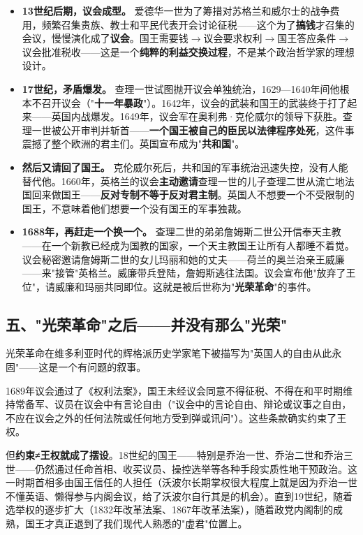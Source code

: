 \documentclass[a4paper,12pt]{ctexart}
\begin{document}
\begin{itemize}
  \item \textbf{13世纪后期，议会成型。} 爱德华一世为了筹措对苏格兰和威尔士的战争费用，频繁召集贵族、教士和平民代表开会讨论征税——这个为了\textbf{搞钱}才召集的会议，慢慢演化成了\textbf{议会}。国王需要钱$\to$议会要求权利$\to$国王答应条件$\to$议会批准税收——这是一个\textbf{纯粹的利益交换过程}，不是某个政治哲学家的理想设计。

  \item \textbf{17世纪，矛盾爆发。} 查理一世试图抛开议会单独统治，1629—1640年间他根本不召开议会（"\textbf{十一年暴政}"）。1642年，议会的武装和国王的武装终于打了起来——英国内战爆发。1649年，议会军在奥利弗·克伦威尔的领导下获胜。查理一世被公开审判并斩首——\textbf{一个国王被自己的臣民以法律程序处死}，这件事震撼了整个欧洲的君主们。英国宣布成为"\textbf{共和国}"。

  \item \textbf{然后又请回了国王。} 克伦威尔死后，共和国的军事统治迅速失控，没有人能替代他。1660年，英格兰的议会\textbf{主动邀请}查理一世的儿子查理二世从流亡地法国回来做国王——\textbf{反对专制不等于反对君主制}。英国人不想要一个不受限制的国王，不意味着他们想要一个没有国王的军事独裁。

  \item \textbf{1688年，再赶走一个换一个。} 查理二世的弟弟詹姆斯二世公开信奉天主教——在一个新教已经成为国教的国家，一个天主教国王让所有人都睡不着觉。议会秘密邀请詹姆斯二世的女儿玛丽和她的丈夫——荷兰的奥兰治亲王威廉——来"接管"英格兰。威廉带兵登陆，詹姆斯逃往法国。议会宣布他"放弃了王位"，请威廉和玛丽共同即位。这就是被后世称为"\textbf{光荣革命}"的事件。
\end{itemize}

\subsection*{五、"光荣革命"之后——并没有那么"光荣"}

光荣革命在维多利亚时代的辉格派历史学家笔下被描写为"英国人的自由从此永固"——这是一个有问题的叙事。

1689年议会通过了《权利法案》，国王未经议会同意不得征税、不得在和平时期维持常备军、议员在议会中有言论自由（"议会中的言论自由、辩论或议事之自由，不应在议会之外的任何法院或任何地方受到弹或讯问"）。这些条款确实约束了王权。

但\textbf{约束≠王权就成了摆设}。18世纪的国王——特别是乔治一世、乔治二世和乔治三世——仍然通过任命首相、收买议员、操控选举等各种手段实质性地干预政治。这一时期首相多由国王信任的人担任（沃波尔长期掌权很大程度上就是因为乔治一世不懂英语、懒得参与内阁会议，给了沃波尔自行其是的机会）。直到19世纪，随着选举权的逐步扩大（1832年改革法案、1867年改革法案），随着政党内阁制的成熟，国王才真正退到了我们现代人熟悉的"虚君"位置上。
\end{document}
